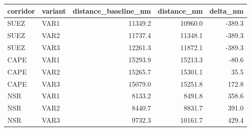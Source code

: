 \begin{tabular}{llrrr}
\toprule
corridor & variant &  distance\_baseline\_nm &  distance\_nm &  delta\_nm \\
\midrule
    SUEZ &    VAR1 &               11349.2 &      10960.0 &    -389.3 \\
    SUEZ &    VAR2 &               11737.4 &      11348.1 &    -389.3 \\
    SUEZ &    VAR3 &               12261.3 &      11872.1 &    -389.3 \\
    CAPE &    VAR1 &               15293.9 &      15213.3 &     -80.6 \\
    CAPE &    VAR2 &               15265.7 &      15301.1 &      35.5 \\
    CAPE &    VAR3 &               15079.0 &      15251.8 &     172.8 \\
     NSR &    VAR1 &                8133.2 &       8491.8 &     358.6 \\
     NSR &    VAR2 &                8440.7 &       8831.7 &     391.0 \\
     NSR &    VAR3 &                9732.3 &      10161.7 &     429.4 \\
\bottomrule
\end{tabular}
